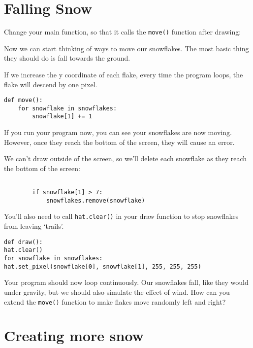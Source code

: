 \section{Falling Snow}

Change your main function, so that it calls the \texttt{move()} function after drawing:



Now we can start thinking of ways to move our snowflakes. The most basic thing they should do is fall towards the ground.

If we increase the y coordinate of each flake, every time the program loops, the flake will descend by one pixel.

\begin{lstlisting}[style=Python, title=move()]
def move():
	for snowflake in snowflakes:
		snowflake[1] += 1
\end{lstlisting}

If you run your program now, you can see your snowflakes are now moving. However, once they reach the bottom of the screen, they will cause an error.

We can't draw outside of the screen, so we'll delete each snowflake as they reach the bottom of the screen:

\begin{lstlisting}[style=Python, title=move(), breaklines=true, firstnumber=4]

		if snowflake[1] > 7:
			snowflakes.remove(snowflake)
\end{lstlisting}

You'll also need to call \texttt{hat.clear()} in your draw function to stop snowflakes from leaving `trails'.

\begin{lstlisting}[style=Python, title=draw()]
def draw():
hat.clear()
for snowflake in snowflakes:
hat.set_pixel(snowflake[0], snowflake[1], 255, 255, 255)
\end{lstlisting}

Your program should now loop continuously. Our snowflakes fall, like they would under gravity, but we should also simulate the effect of wind. How can you extend the \texttt{move()} function to make flakes move randomly left and right?

\section{Creating more snow}


